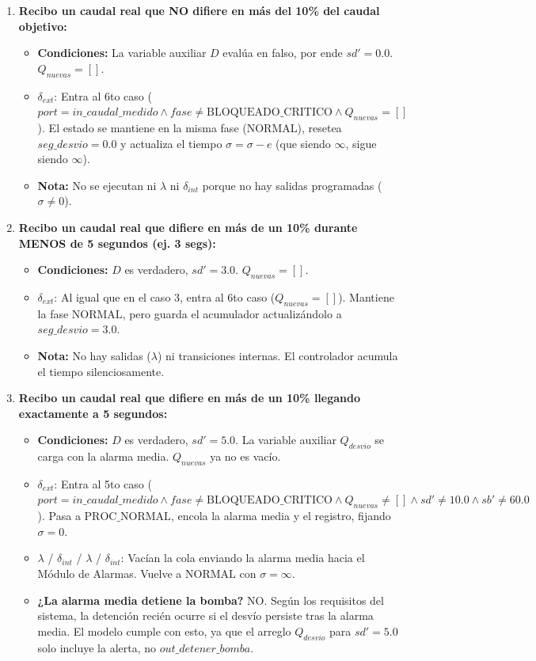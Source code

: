 \begin{itemize}
\begin{enumerate}
        \item \textbf{Recibo un caudal real que NO difiere en más del 10\% del caudal objetivo:}
        \begin{itemize}
            \item \textbf{Condiciones:} La variable auxiliar $D$ evalúa en falso, por ende $sd' = 0.0$. $Q_{nuevas} = [ ]$.
            \item $\delta_{ext}$: Entra al 6to caso ($port = in\_caudal\_medido \land fase \neq \text{BLOQUEADO\_CRITICO} \land Q_{nuevas} = [ ]$). El estado se mantiene en la misma fase ($\text{NORMAL}$), resetea $seg\_desvio = 0.0$ y actualiza el tiempo $\sigma = \sigma - e$ (que siendo $\infty$, sigue siendo $\infty$).
            \item \textbf{Nota:} No se ejecutan ni $\lambda$ ni $\delta_{int}$ porque no hay salidas programadas ($\sigma \neq 0$).
        \end{itemize}

        \item \textbf{Recibo un caudal real que difiere en más de un 10\% durante MENOS de 5 segundos (ej. 3 segs):}
        \begin{itemize}
            \item \textbf{Condiciones:} $D$ es verdadero, $sd' = 3.0$. $Q_{nuevas} = [ ]$.
            \item $\delta_{ext}$: Al igual que en el caso 3, entra al 6to caso ($Q_{nuevas} = [ ]$). Mantiene la fase $\text{NORMAL}$, pero guarda el acumulador actualizándolo a $seg\_desvio = 3.0$.
            \item \textbf{Nota:} No hay salidas ($\lambda$) ni transiciones internas. El controlador acumula el tiempo silenciosamente.
        \end{itemize}

        \item \textbf{Recibo un caudal real que difiere en más de un 10\% llegando exactamente a 5 segundos:}
        \begin{itemize}
            \item \textbf{Condiciones:} $D$ es verdadero, $sd' = 5.0$. La variable auxiliar $Q_{desvio}$ se carga con la alarma media. $Q_{nuevas}$ ya no es vacío.
            \item $\delta_{ext}$: Entra al 5to caso ($port = in\_caudal\_medido \land fase \neq \text{BLOQUEADO\_CRITICO} \land Q_{nuevas} \neq [ ] \land sd' \neq 10.0 \land sb' \neq 60.0$). Pasa a $\text{PROC\_NORMAL}$, encola la alarma media y el registro, fijando $\sigma = 0$.
            \item $\lambda$ / $\delta_{int}$ / $\lambda$ / $\delta_{int}$: Vacían la cola enviando la alarma media hacia el Módulo de Alarmas. Vuelve a $\text{NORMAL}$ con $\sigma = \infty$.
            \item \textbf{¿La alarma media detiene la bomba?} NO. Según los requisitos del sistema, la detención recién ocurre si el desvío persiste tras la alarma media. El modelo cumple con esto, ya que el arreglo $Q_{desvio}$ para $sd'=5.0$ solo incluye la alerta, no $out\_detener\_bomba$.
        \end{itemize}


\end{enumerate}
\end{itemize}
